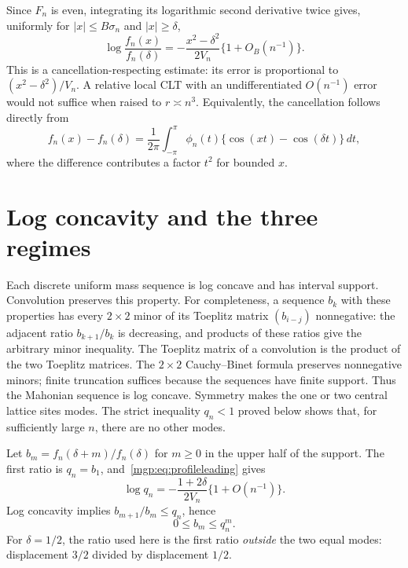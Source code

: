 \documentclass[11pt]{article}
\newcommand{\V}{V_n}\newcommand{\T}{T_{n,r}}\newcommand{\Z}{\mathbb Z}\newcommand{\E}{\mathbb E}\newcommand{\dd}{\,d}
\begin{document}
Since $F_n$ is even, integrating its logarithmic second derivative twice gives, uniformly for $|x|\le B\sigma_n$ and $|x|\ge\delta$,
\begin{equation}\label{mgp:eq:profileleading}
 \log\frac{f_n(x)}{f_n(\delta)}
 =-\frac{x^2-\delta^2}{2\V}\{1+O_B(n^{-1})\}.
\end{equation}
This is a cancellation-respecting estimate: its error is proportional to $(x^2-\delta^2)/\V$. A relative local CLT with an undifferentiated $O(n^{-1})$ error would not suffice when raised to $r\asymp n^3$. Equivalently, the cancellation follows directly from
\[
 f_n(x)-f_n(\delta)=\frac1{2\pi}\int_{-\pi}^{\pi}
 \phi_n(t)\{\cos(xt)-\cos(\delta t)\}\dd t,
\]
where the difference contributes a factor $t^2$ for bounded $x$.

\section{Log concavity and the three regimes}
Each discrete uniform mass sequence is log concave and has interval support. Convolution preserves this property. For completeness, a sequence $b_k$ with these properties has every $2\times2$ minor of its Toeplitz matrix $(b_{i-j})$ nonnegative: the adjacent ratio $b_{k+1}/b_k$ is decreasing, and products of these ratios give the arbitrary minor inequality. The Toeplitz matrix of a convolution is the product of the two Toeplitz matrices. The $2\times2$ Cauchy--Binet formula preserves nonnegative minors; finite truncation suffices because the sequences have finite support. Thus the Mahonian sequence is log concave. Symmetry makes the one or two central lattice sites modes. The strict inequality $q_n<1$ proved below shows that, for sufficiently large $n$, there are no other modes.

Let $b_m=f_n(\delta+m)/f_n(\delta)$ for $m\ge0$ in the upper half of the support. The first ratio is $q_n=b_1$, and~\eqref{mgp:eq:profileleading} gives
\begin{equation}\label{mgp:eq:q}
 \log q_n=-\frac{1+2\delta}{2\V}\{1+O(n^{-1})\}.
\end{equation}
Log concavity implies $b_{m+1}/b_m\le q_n$, hence
\begin{equation}\label{mgp:eq:domination}
 0\le b_m\le q_n^m.
\end{equation}
For $\delta=1/2$, the ratio used here is the first ratio \emph{outside} the two equal modes: displacement $3/2$ divided by displacement $1/2$.
\end{document}
